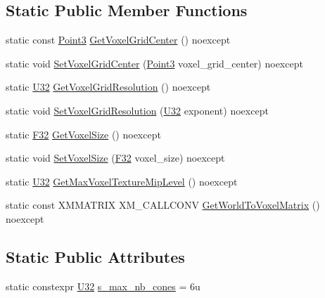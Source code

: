 \subsection*{Static Public Member Functions}
\begin{DoxyCompactItemize}
\item 
static const \hyperlink{structmage_1_1_point3}{Point3} \hyperlink{classmage_1_1rendering_1_1_voxelization_settings_a3607b62516e690c192d356b59375ba18}{Get\+Voxel\+Grid\+Center} () noexcept
\item 
static void \hyperlink{classmage_1_1rendering_1_1_voxelization_settings_ad4a2dd741cdd4187eaaa2492fb1ca533}{Set\+Voxel\+Grid\+Center} (\hyperlink{structmage_1_1_point3}{Point3} voxel\+\_\+grid\+\_\+center) noexcept
\item 
static \hyperlink{namespacemage_a41c104c036fba3756a74e19f793eeaa1}{U32} \hyperlink{classmage_1_1rendering_1_1_voxelization_settings_a81a186bbca9250f2021fb4bbeff6f831}{Get\+Voxel\+Grid\+Resolution} () noexcept
\item 
static void \hyperlink{classmage_1_1rendering_1_1_voxelization_settings_aeffbe093b1df8a738906db2249961ed8}{Set\+Voxel\+Grid\+Resolution} (\hyperlink{namespacemage_a41c104c036fba3756a74e19f793eeaa1}{U32} exponent) noexcept
\item 
static \hyperlink{namespacemage_aa97e833b45f06d60a0a9c4fc22ae02c0}{F32} \hyperlink{classmage_1_1rendering_1_1_voxelization_settings_ae9c6e798bef7bbbb3031026eccbe6873}{Get\+Voxel\+Size} () noexcept
\item 
static void \hyperlink{classmage_1_1rendering_1_1_voxelization_settings_a4e1c575474a1301981bc0a0070c2c841}{Set\+Voxel\+Size} (\hyperlink{namespacemage_aa97e833b45f06d60a0a9c4fc22ae02c0}{F32} voxel\+\_\+size) noexcept
\item 
static \hyperlink{namespacemage_a41c104c036fba3756a74e19f793eeaa1}{U32} \hyperlink{classmage_1_1rendering_1_1_voxelization_settings_aacf64e0e4be2e7260793dfefe7f332cb}{Get\+Max\+Voxel\+Texture\+Mip\+Level} () noexcept
\item 
static const X\+M\+M\+A\+T\+R\+IX X\+M\+\_\+\+C\+A\+L\+L\+C\+O\+NV \hyperlink{classmage_1_1rendering_1_1_voxelization_settings_ac0eb16df3bfae7218b27e1c1cdf1399f}{Get\+World\+To\+Voxel\+Matrix} () noexcept
\end{DoxyCompactItemize}
\subsection*{Static Public Attributes}
\begin{DoxyCompactItemize}
\item 
static constexpr \hyperlink{namespacemage_a41c104c036fba3756a74e19f793eeaa1}{U32} \hyperlink{classmage_1_1rendering_1_1_voxelization_settings_a7d5ceb0965e5c3a9aa1e16dd6dd06eed}{s\+\_\+max\+\_\+nb\+\_\+cones} = 6u
\end{DoxyCompactItemize}

